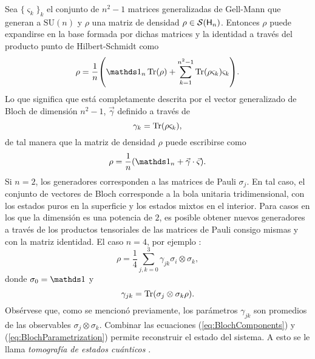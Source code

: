 Sea $\{\varsigma_{k}\}_{k}$ el conjunto de $n^{2}-1$ matrices generalizadas de Gell-Mann que generan a $\text{SU}(n)$ y $\rho$ una matriz de densidad $\rho\in\mathcal{S}({\sf H}_{n})$. Entonces $\rho$ puede expandirse en la base formada por dichas matrices y la identidad a través del producto punto de Hilbert-Schmidt como
\begin{equation}
    \rho=\frac{1}{n}\qty(\Id_{n}\Tr(\rho)+\sum_{k=1}^{n^{2}-1}\Tr(\rho\varsigma_{k})\varsigma_{k}).\nonumber
\end{equation}
Lo que significa que está completamente descrita por el vector generalizado de Bloch de dimensión $n^{2}-1$, $\vec{\gamma}$ definido a través de
\begin{equation}
    \gamma_{k}=\Tr(\rho\varsigma_{k}),\nonumber
\end{equation}
de tal manera que la matriz de densidad $\rho$ puede escribirse como
\begin{equation}\label{eq:BlochParametrization}
    \rho=\frac{1}{n}\qty(\Id_{n}+\vec{\gamma}\cdot\vec{\varsigma}).
\end{equation}
Si $n=2$, los generadores corresponden a las matrices de Pauli $\sigma_{j}$. En tal caso, el conjunto de vectores de Bloch corresponde a la bola unitaria tridimensional, con los estados puros en la superficie y los estados mixtos en el interior. Para casos en los que la dimensión es una potencia de $2$, es posible obtener nuevos generadores a través de los productos tensoriales de las matrices de Pauli consigo mismas y con la matriz identidad. El caso $n=4$, por ejemplo \cite{Chuang}:
\begin{equation}\label{eq:BlochParametrization4}
    \rho=\frac{1}{4}\sum_{j,k=0}^{3}\gamma_{jk}\sigma_{i}\otimes \sigma_{k},\nonumber
\end{equation}
donde $\sigma_{0}=\Id$ y 
\begin{equation}\label{eq:BlochComponents}
        \gamma_{jk}=\Tr(\sigma_{j}\otimes \sigma_{k}\rho).
\end{equation}
Obsérvese que, como se mencionó previamente, los parámetros $\gamma_{jk}$ son promedios de las observables $\sigma_{j} \otimes \sigma_{k}$. Combinar las ecuaciones (\ref{eq:BlochComponents}) y (\ref{eq:BlochParametrization}) permite reconstruir el estado del sistema. A esto se le llama \textit{tomografía de estados cuánticos} \cite{Chuang}.
